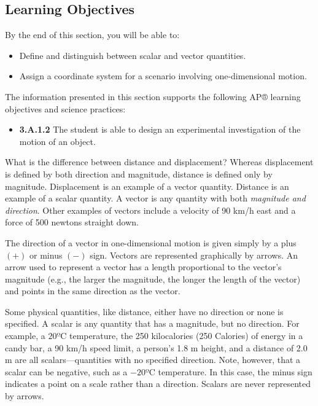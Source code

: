 \documentclass[
]{book}
\providecommand{\tightlist}{%
  \setlength{\itemsep}{0pt}\setlength{\parskip}{0pt}}
\newenvironment{learning-objectives}{}{}
\begin{document}
\hypertarget{fs-id1545372}{}
\begin{learning-objectives}

\hypertarget{learning-objectives-1}{%
\subsection{Learning Objectives}\label{learning-objectives-1}}

By the end of this section, you will be able to:

\begin{itemize}
\tightlist
\item
  Define and distinguish between scalar and vector quantities.
\item
  Assign a coordinate system for a scenario involving one-dimensional
  motion.
\end{itemize}

The information presented in this section supports the following AP®
learning objectives and science practices:

\begin{itemize}
\tightlist
\item
  \textbf{3.A.1.2} The student is able to design an experimental
  investigation of the motion of an object.
\end{itemize}

\end{learning-objectives}

What is the difference between distance and displacement? Whereas
displacement is defined by both direction and magnitude, distance is
defined only by magnitude. Displacement is an example of a vector
quantity. Distance is an example of a scalar quantity. A
\protect\hypertarget{import-auto-id1738434}{}{vector} is any quantity with
both \emph{magnitude and direction}. Other examples of vectors include a
velocity of 90 km/h east and a force of 500 newtons straight down.

The direction of a vector in one-dimensional motion is given simply by a
plus \({( + )}{}\) or minus \({( - )}{}\) sign. Vectors are represented
graphically by arrows. An arrow used to represent a vector has a length
proportional to the vector's magnitude (e.g., the larger the magnitude,
the longer the length of the vector) and points in the same direction as
the vector.

Some physical quantities, like distance, either have no direction or
none is specified. A \protect\hypertarget{import-auto-id1759638}{}{scalar}
is any quantity that has a magnitude, but no direction. For example, a
\(\text{20ºC}\) temperature, the 250 kilocalories (250 Calories) of energy
in a candy bar, a 90 km/h speed limit, a person's 1.8 m height, and a
distance of 2.0 m are all scalars---quantities with no specified
direction. Note, however, that a scalar can be negative, such as a
\(- \text{20ºC}\) temperature. In this case, the minus sign indicates a
point on a scale rather than a direction. Scalars are never represented
by arrows.
\end{document}
